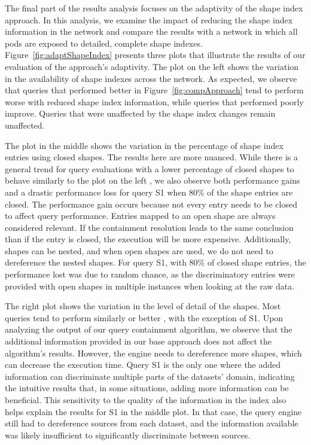 The final part of the results analysis focuses on the adaptivity of the shape index approach.
In this analysis, we examine the impact of reducing the shape index information in the network and compare the results with a network in which all pods are exposed to detailed, complete shape indexes.
Figure~\ref{fig:adaptShapeIndex} presents three plots that illustrate the results of our evaluation of the approach's adaptivity.
The plot on the left  shows the variation in the availability of shape indexes across the network. 
As expected, we observe that queries that performed better in Figure~\ref{fig:compApproach} tend to perform worse with reduced shape index information, while queries that performed poorly improve. 
Queries that were unaffected by the shape index changes remain unaffected.

The plot in the middle  shows the variation in the percentage of shape index entries using closed shapes.
The results here are more nuanced.
While there is a general trend for query evaluations with a lower percentage of closed shapes to behave similarly to the plot on the left , we also observe both performance gains and a drastic performance loss  for query S1 when 80\% of the shape entries are closed.
The performance gain occurs because not every entry needs to be closed to affect query performance.
Entries mapped to an open shape are always considered relevant.
If the containment resolution leads to the same conclusion than if the entry is closed, the execution will be more expensive. 
Additionally, shapes can be nested, and when open shapes are used, we do not need to dereference the nested shapes.
For query S1, with 80\% of closed shape entries, the performance lost was due to random chance, as the discriminatory entries were provided with open shapes in multiple instances when looking at the raw data.

The right plot  shows the variation in the level of detail of the shapes.
Most queries tend to perform similarly or better , with the exception of S1.
Upon analyzing the output of our query containment algorithm, we observe that the additional information  provided in our base approach does not affect the algorithm’s results.
However, the engine needs to dereference more shapes, which can decrease the execution time.
Query S1 is the only one where the added information can discriminate multiple parts of the datasets' domain, indicating the intuitive results that, in some situations, adding more information can be beneficial.
This sensitivity to the quality  of the information in the index also helps explain the results for S1 in the middle plot. 
In that case, the query engine still had to dereference sources from each dataset, and the information available was likely insufficient to significantly discriminate between sources.

